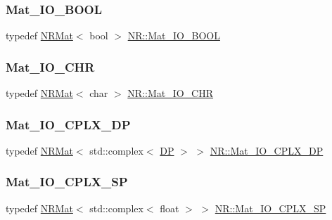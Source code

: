 \mbox{\label{namespaceNR_a82a88d1a8eaf0a352f9dc5d5976253c4}} 
\subsubsection{\texorpdfstring{Mat\_IO\_BOOL}{Mat\_IO\_BOOL}}
{\footnotesize\ttfamily typedef \mbox{\hyperlink{classNR_1_1NRMat}{N\+R\+Mat}}$<$ bool $>$ \mbox{\hyperlink{namespaceNR_a82a88d1a8eaf0a352f9dc5d5976253c4}{N\+R\+::\+Mat\+\_\+\+I\+O\+\_\+\+B\+O\+OL}}}

\mbox{\label{namespaceNR_aebd44b690f4f5f165100ac3d68c3405f}} 
\subsubsection{\texorpdfstring{Mat\_IO\_CHR}{Mat\_IO\_CHR}}
{\footnotesize\ttfamily typedef \mbox{\hyperlink{classNR_1_1NRMat}{N\+R\+Mat}}$<$ char $>$ \mbox{\hyperlink{namespaceNR_aebd44b690f4f5f165100ac3d68c3405f}{N\+R\+::\+Mat\+\_\+\+I\+O\+\_\+\+C\+HR}}}

\mbox{\label{namespaceNR_a8a17341866e8608bfddf21602c8b9f89}} 
\subsubsection{\texorpdfstring{Mat\_IO\_CPLX\_DP}{Mat\_IO\_CPLX\_DP}}
{\footnotesize\ttfamily typedef \mbox{\hyperlink{classNR_1_1NRMat}{N\+R\+Mat}}$<$ std\+::complex$<$ \mbox{\hyperlink{namespaceNR_af6ff762dd605ff477b8e52387253a02a}{DP}} $>$ $>$ \mbox{\hyperlink{namespaceNR_a8a17341866e8608bfddf21602c8b9f89}{N\+R\+::\+Mat\+\_\+\+I\+O\+\_\+\+C\+P\+L\+X\+\_\+\+DP}}}

\mbox{\label{namespaceNR_a4e456bc4660685058fb8a3f9e73220ef}} 
\subsubsection{\texorpdfstring{Mat\_IO\_CPLX\_SP}{Mat\_IO\_CPLX\_SP}}
{\footnotesize\ttfamily typedef \mbox{\hyperlink{classNR_1_1NRMat}{N\+R\+Mat}}$<$ std\+::complex$<$ float $>$ $>$ \mbox{\hyperlink{namespaceNR_a4e456bc4660685058fb8a3f9e73220ef}{N\+R\+::\+Mat\+\_\+\+I\+O\+\_\+\+C\+P\+L\+X\+\_\+\+SP}}}

